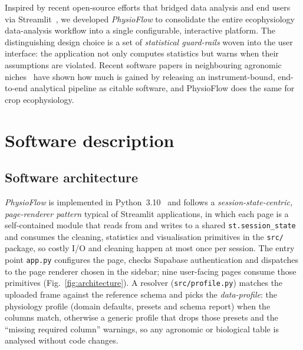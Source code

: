 \documentclass[a4paper,fleqn]{cas-dc}
\begin{document}
Inspired by recent open-source efforts that bridged data analysis and end users via Streamlit~\cite{Streamlit,daSilva2025Parkinson,DaSilva2026Goias}, we developed \emph{PhysioFlow} to consolidate the entire ecophysiology data-analysis workflow into a single configurable, interactive platform. The distinguishing design choice is a set of \emph{statistical guard-rails} woven into the user interface: the application not only computes statistics but warns when their assumptions are violated. Recent software papers in neighbouring agronomic niches~\cite{Magnani2026apsimNGpy,Crecco2026prismatools} have shown how much is gained by releasing an instrument-bound, end-to-end analytical pipeline as citable software, and PhysioFlow does the same for crop ecophysiology.

\section{Software description}\label{sec:software}

\subsection{Software architecture}\label{sec:arch}

\emph{PhysioFlow} is implemented in Python~3.10~\cite{Streamlit,McKinney2010,Harris2020} and follows a \emph{session-state-centric, page-renderer pattern} typical of Streamlit applications, in which each page is a self-contained module that reads from and writes to a shared \texttt{st.session\_state} and consumes the cleaning, statistics and visualisation primitives in the \texttt{src/} package, so costly I/O and cleaning happen at most once per session. The entry point \texttt{app.py} configures the page, checks Supabase authentication and dispatches to the page renderer chosen in the sidebar; nine user-facing pages consume those primitives (Fig.~\ref{fig:architecture}). A resolver (\texttt{src/profile.py}) matches the uploaded frame against the reference schema and picks the \emph{data-profile}: the physiology profile (domain defaults, presets and schema report) when the columns match, otherwise a generic profile that drops those presets and the ``missing required column'' warnings, so any agronomic or biological table is analysed without code changes.
\end{document}
